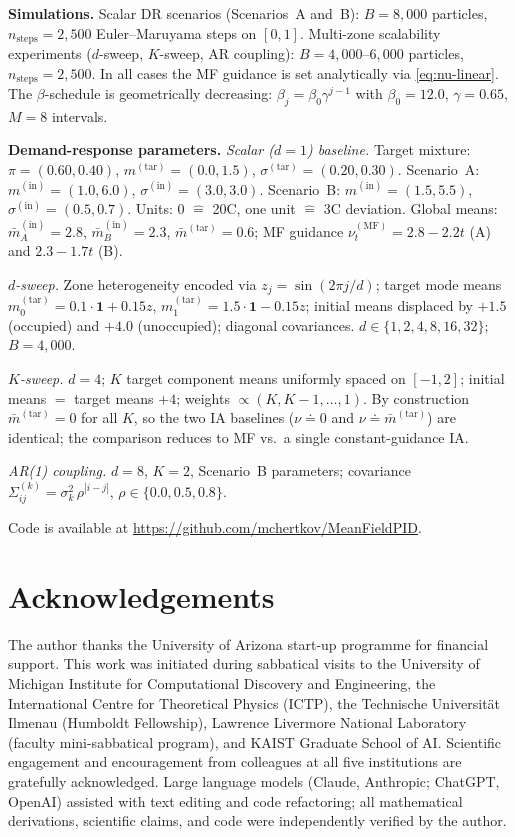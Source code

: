\documentclass[11pt,onecolumn]{article}
\newcommand{\MF}{\mathrm{MF}}
\begin{document}
\textbf{Simulations.} Scalar DR scenarios (Scenarios~A and~B): $B=8{,}000$ particles, $n_\mathrm{steps}=2{,}500$ Euler--Maruyama steps on $[0,1]$. Multi-zone scalability experiments ($d$-sweep, $K$-sweep, AR coupling): $B=4{,}000$--$6{,}000$ particles, $n_\mathrm{steps}=2{,}500$. In all cases the MF guidance is set analytically via \eqref{eq:nu-linear}. The $\beta$-schedule is geometrically decreasing: $\beta_j = \beta_0\gamma^{j-1}$ with $\beta_0=12.0$, $\gamma=0.65$, $M=8$ intervals.

\textbf{Demand-response parameters.} \emph{Scalar ($d=1$) baseline.} Target mixture: $\pi=(0.60,0.40)$, $m^{(\mathrm{tar})}=(0.0,1.5)$, $\sigma^{(\mathrm{tar})}=(0.20,0.30)$. Scenario~A: $m^{(\mathrm{in})}=(1.0,6.0)$, $\sigma^{(\mathrm{in})}=(3.0,3.0)$. Scenario~B: $m^{(\mathrm{in})}=(1.5,5.5)$, $\sigma^{(\mathrm{in})}=(0.5,0.7)$. Units: 0 $\widehat{=}$ 20\textdegree C, one unit $\widehat{=}$ 3\textdegree C deviation. Global means: $\bar m^{(\mathrm{in})}_A = 2.8$, $\bar m^{(\mathrm{in})}_B = 2.3$, $\bar m^{(\mathrm{tar})} = 0.6$; MF guidance $\nu_t^{(\MF)} = 2.8 - 2.2t$ (A) and $2.3 - 1.7t$ (B).

\emph{$d$-sweep.} Zone heterogeneity encoded via $z_j = \sin(2\pi j/d)$; target mode means $m^{(\mathrm{tar})}_0 = 0.1\cdot\mathbf{1} + 0.15z$, $m^{(\mathrm{tar})}_1 = 1.5\cdot\mathbf{1} - 0.15z$; initial means displaced by $+1.5$ (occupied) and $+4.0$ (unoccupied); diagonal covariances. $d \in \{1,2,4,8,16,32\}$; $B=4{,}000$.

\emph{$K$-sweep.} $d=4$; $K$ target component means uniformly spaced on $[-1,2]$; initial means $= $ target means $+4$; weights $\propto (K,K{-}1,\ldots,1)$. By construction $\bar m^{(\mathrm{tar})}=0$ for all $K$, so the two IA baselines ($\nu\doteq 0$ and $\nu\doteq\bar m^{(\mathrm{tar})}$) are identical; the comparison reduces to MF vs.\ a single constant-guidance IA.

\emph{AR(1) coupling.} $d=8$, $K=2$, Scenario~B parameters; covariance $\Sigma^{(k)}_{ij} = \sigma_k^2\,\rho^{|i-j|}$, $\rho\in\{0.0, 0.5, 0.8\}$.


Code is available at \url{https://github.com/mchertkov/MeanFieldPID}.

\section*{Acknowledgements}

The author thanks the University of Arizona start-up programme for financial support. This work was initiated during sabbatical visits to the University of Michigan Institute for Computational Discovery and Engineering, the International Centre for Theoretical Physics (ICTP), the Technische Universit\"at Ilmenau (Humboldt Fellowship), Lawrence Livermore National Laboratory (faculty mini-sabbatical program), and KAIST Graduate School of AI. Scientific engagement and encouragement from colleagues at all five institutions are gratefully acknowledged. Large language models (Claude, Anthropic; ChatGPT, OpenAI) assisted with text editing and code refactoring; all mathematical derivations, scientific claims, and code were independently verified by the author.
\end{document}
